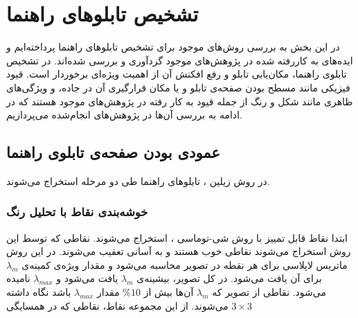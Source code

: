 \documentclass[oneside,openany,msc]{SBU-Thesis}
\begin{document}
	\section{تشخیص تابلوهای راهنما}
	\label{sec:panelReview}
	
	در این بخش به بررسی روش‌های موجود برای تشخیص تابلوهای راهنما پرداخته‌ایم و ایده‌های به کاررفته شده در پژوهش‌های موجود گردآوری و بررسی شده‌اند. در تشخیص تابلوی راهنما، مکان‌یابی تابلو و رفع افکنش آن از اهمیت ویژه‌ای برخوردار است. قیود فیزیکی مانند مسطح بودن صفحه‌ی تابلو و یا مکان قرارگیری آن در جاده، و ویژگی‌های ظاهری مانند شکل و رنگ از جمله قیود به کار رفته در پژوهش‌های موجود هستند که در ادامه به بررسی آن‌ها در پژوهش‌های انجام‌شده می‌پردازیم. 
	
	\subsection{عمودی بودن صفحه‌ی تابلوی راهنما}
	
	در روش زیلین \cite{Wu2005}، تابلوهای راهنما طی دو مرحله استخراج می‌شوند. 
	
	
	
	\subsubsection{خوشه‌بندی نقاط با تحلیل رنگ}
	ابتدا نقاط قابل تمییز با روش شی-توماسی \cite{shi1994good}، استخراج می‌شوند. نقاطی که توسط این روش استخراج می‌شوند نقاطی خوب هستند و به آسانی تعقیب می‌شوند. در این روش ماتریس لاپلاسی برای هر نقطه در تصویر محاسبه می‌شود و مقدار ویژه‌ی کمینه‌ی $\lambda_m$ برای آن یافت می‌شود. در کل تصویر، بیشینه‌ی $\lambda_m$ یافت می‌شود و $\lambda_{max}$ نامیده می‌شود. نقاطی از تصویر که $\lambda_m$ آن‌ها بیش از 
	$\% 10$ 
	مقدار $\lambda_{max}$ باشد نگاه داشته می‌شوند. از این مجموعه نقاط، نقاطی که در همسایگی
	$ 3 \times 3 $ 
	
\end{document}
